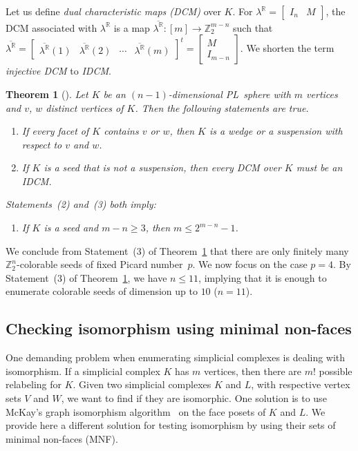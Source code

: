 \documentclass[11pt]{amsart}
\theoremstyle{plain}
\newtheorem{theorem}{Theorem}[section]
\numberwithin{equation}{section}
\theoremstyle{definition}
\newcommand{\R}{\mathbb{R}}
\newcommand{\Z}{\mathbb{Z}}
\begin{document}
Let us define \emph{dual characteristic maps (DCM)} over $K$.
For $\lambda^\R = \begin{bmatrix} I_n & M \end{bmatrix}$, the DCM associated with $\lambda^\R$ is a map $\overline{\lambda^\R} \colon [m] \longrightarrow \Z_2^{m-n}$ such that $\overline{\lambda^\R} = \begin{bmatrix} \overline{\lambda^\R}(1) & \overline{\lambda^\R}(2) & \cdots & \overline{\lambda^\R}(m) \end{bmatrix}^t = \begin{bmatrix} M \\ I_{m-n} \end{bmatrix}$.
We shorten the term \emph{injective DCM} to \emph{IDCM}.

\begin{theorem} [\cite{CP_wedge_2}]\label{theorem:IDCM}
	Let $K$ be an $(n-1)$-dimensional PL~sphere with $m$ vertices and $v$, $w$ distinct vertices of $K$.
	Then the following statements are true.
	\begin{enumerate}
		\item If every facet of $K$ contains $v$ or $w$, then $K$ is a wedge or a suspension with respect to $v$ and $w$.
		\item If $K$ is a seed that is not a suspension, then every DCM over $K$ must be an IDCM.
	\end{enumerate}
	Statements~(2) and~(3) both imply:
	\begin{enumerate}[resume]
		\item If $K$ is a seed and $m-n \geq 3$, then $m \leq 2^{m-n}-1$.
	\end{enumerate}
\end{theorem}
We conclude from Statement~(3) of Theorem~\ref{theorem:IDCM} that there are only finitely many $\Z_2^n$-colorable seeds of fixed Picard number~$p$.
We now focus on the case $p=4$.
By Statement~(3) of Theorem~\ref{theorem:IDCM}, we have $n \leq 11$, implying that it is enough to enumerate colorable seeds of dimension up to $10$ ($n=11$).


\subsection{Checking isomorphism using minimal non-faces} \label{subsection:isom}

One demanding problem when enumerating simplicial complexes is dealing with isomorphism.
If a simplicial complex $K$ has $m$ vertices, then there are $m!$ possible relabeling for $K$.
Given two simplicial complexes $K$ and $L$, with respective vertex sets $V$ and $W$, we want to find if they are isomorphic.
One solution is to use McKay's graph isomorphism algorithm~\cite{McKay1981} on the face posets of $K$ and $L$.
We provide here a different solution for testing isomorphism by using their sets of minimal non-faces (MNF).
\end{document}
